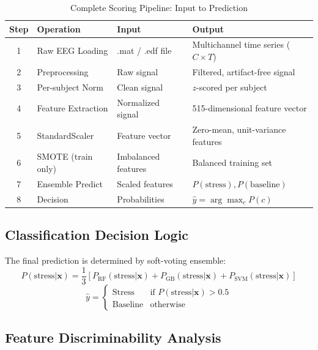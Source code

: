 \documentclass[11pt,a4paper]{article}
\begin{document}
\begin{table}[H]
\centering
\caption{Complete Scoring Pipeline: Input to Prediction}
\small
\begin{tabular}{cllp{6cm}}
\toprule
\textbf{Step} & \textbf{Operation} & \textbf{Input} & \textbf{Output} \\
\midrule
1 & Raw EEG Loading & .mat / .edf file & Multichannel time series ($C \times T$) \\
2 & Preprocessing & Raw signal & Filtered, artifact-free signal \\
3 & Per-subject Norm & Clean signal & $z$-scored per subject \\
4 & Feature Extraction & Normalized signal & 515-dimensional feature vector \\
5 & StandardScaler & Feature vector & Zero-mean, unit-variance features \\
6 & SMOTE (train only) & Imbalanced features & Balanced training set \\
7 & Ensemble Predict & Scaled features & $P(\text{stress}), P(\text{baseline})$ \\
8 & Decision & Probabilities & $\hat{y} = \arg\max_c P(c)$ \\
\bottomrule
\end{tabular}
\end{table}

\subsection{Classification Decision Logic}

The final prediction is determined by soft-voting ensemble:
\begin{equation}
P(\text{stress} | \mathbf{x}) = \frac{1}{3}\left[P_{\text{RF}}(\text{stress} | \mathbf{x}) + P_{\text{GB}}(\text{stress} | \mathbf{x}) + P_{\text{SVM}}(\text{stress} | \mathbf{x})\right]
\end{equation}
\begin{equation}
\hat{y} = \begin{cases} \text{Stress} & \text{if } P(\text{stress} | \mathbf{x}) > 0.5 \\ \text{Baseline} & \text{otherwise} \end{cases}
\end{equation}

\subsection{Feature Discriminability Analysis}
\end{document}
